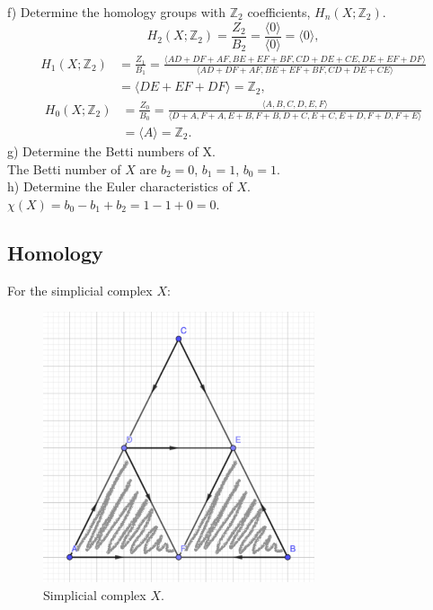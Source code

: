 \documentclass[a4paper,11pt]{article}
\begin{document}
f) Determine the homology groups with $\mathbb{Z}_2$ coefficients, $H_n(X;\mathbb{Z}_2)$.
$$
H_2(X;\mathbb{Z}_2) = \frac{Z_2}{B_2} = \frac{\langle 0 \rangle}{\langle 0 \rangle} = \langle 0 \rangle,
$$
\begin{align*}
H_1(X;\mathbb{Z}_2) &= \frac{Z_1}{B_1} = \frac{\langle AD + DF + AF, BE + EF + BF, CD + DE + CE, DE + EF + DF \rangle}{\langle AD + DF + AF, BE + EF + BF, CD + DE + CE \rangle} 
\\
&= \langle DE + EF + DF \rangle = \mathbb{Z}_2,
\end{align*}
\begin{align*}
H_0(X;\mathbb{Z}_2) &= \frac{Z_0}{B_0} = \frac{\langle A, B, C, D, E, F \rangle}{\langle D + A, F + A, E + B, F + B, D + C, E + C, E + D, F + D, F + E \rangle} 
\\
&= \langle A \rangle = \mathbb{Z}_2.
\end{align*}
g) Determine the Betti numbers of X.
\\
The Betti number of $X$ are $b_2 = 0$, $b_1 = 1$, $b_0 = 1$.
\\
h) Determine the Euler characteristics of $X$.
\\
$\chi(X) = b_0 - b_1 + b_2 = 1 - 1 + 0 = 0$.


\subsection{Homology}
For the simplicial complex $X$:

\begin{figure}[ht!]
    \centering
    \includegraphics[width=80mm]{1b.png}
    \caption{Simplicial complex $X$.}
\end{figure}
\end{document}
